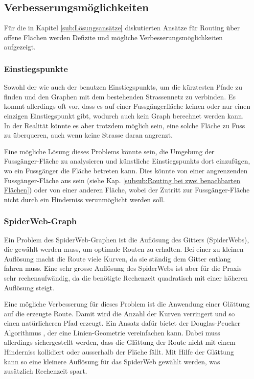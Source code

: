 \subsection{Verbesserungsmöglichkeiten}
\label{sub:Verbesserungsmöglichkeiten}
Für die in Kapitel \ref{sub:Lösungsansätze} diskutierten Ansätze für Routing über offene Flächen werden Defizite und mögliche Verbesserungsmöglichkeiten aufgezeigt.

\subsubsection{Einstiegspunkte}
\label{subsub:Verbesserung_Einstiegspunkte}

Sowohl der  wie auch der  benutzen \glspl{Einstiegspunkt}, um die kürztesten Pfade zu finden und den Graphen mit dem bestehenden Strassennetz zu verbinden. Es kommt allerdings oft vor, dass es auf einer Fussgängerfläche keinen oder nur einen einzigen Einstiegspunkt gibt, wodurch auch kein Graph berechnet werden kann. In der Realität könnte es aber trotzdem möglich sein, eine solche Fläche zu Fuss zu überqueren, auch wenn keine Strasse daran angrenzt.

Eine mögliche Lösung dieses Problems könnte sein, die Umgebung der Fussgänger-Fläche zu analysieren und künstliche \glspl{Einstiegspunkt} dort einzufügen, wo ein Fussgänger die Fläche betreten kann. Dies könnte von einer angrenzenden Fussgänger-Fläche aus sein (siehe Kap. \ref{subsub:Routing bei zwei benachbarten Flächen}) oder von einer anderen Fläche, wobei der Zutritt zur Fussgänger-Fläche nicht durch ein Hinderniss verunmöglicht werden soll.

\subsubsection{SpiderWeb-Graph}
\label{subsub:Verbesserung_SpiderWeb}

Ein Problem des SpiderWeb-Graphen ist die Auflösung des Gitters (SpiderWebs), die gewählt werden muss, um optimale Routen zu erhalten. Bei einer zu kleinen Auflösung macht die Route viele Kurven, da sie ständig dem Gitter entlang fahren muss. Eine sehr grosse Auflösung des SpiderWebs ist aber für die Praxis sehr rechenaufwändig, da die benötigte Rechenzeit quadratisch mit einer höheren Auflösung steigt.

Eine mögliche Verbesserung für dieses Problem ist die Anwendung einer Glättung auf die erzeugte Route. Damit wird die Anzahl der Kurven verringert und so einen natürlicheren Pfad erzeugt. Ein Ansatz dafür bietet der Douglas-Peucker Algorithmus \cite{douglas-peucker_algorithm}, der eine Linien-Geometrie vereinfachen kann. Dabei muss allerdings sichergestellt werden, dass die Glättung der Route nicht mit einem Hinderniss kollidiert oder ausserhalb der Fläche fällt. Mit Hilfe der Glättung kann so eine kleinere Auflösung für das SpiderWeb gewählt werden, was zusätzlich Rechenzeit spart.